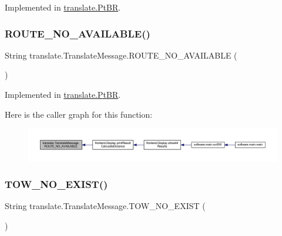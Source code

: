 Implemented in \hyperlink{classtranslate_1_1_pt_b_r_aa9cef0ea9eb36d51a17532a6c216e6bd}{translate.\+Pt\+BR}.

\mbox{\label{interfacetranslate_1_1_translate_message_a0344fddc67cf717c9129ef5677d0c0aa}} 
\subsubsection{\texorpdfstring{R\+O\+U\+T\+E\+\_\+\+N\+O\+\_\+\+A\+V\+A\+I\+L\+A\+B\+L\+E()}{ROUTE\_NO\_AVAILABLE()}}
{\footnotesize\ttfamily String translate.\+Translate\+Message.\+R\+O\+U\+T\+E\+\_\+\+N\+O\+\_\+\+A\+V\+A\+I\+L\+A\+B\+LE (\begin{DoxyParamCaption}{ }\end{DoxyParamCaption})}



Implemented in \hyperlink{classtranslate_1_1_pt_b_r_a218e01c1590aa220f2c260639080cca2}{translate.\+Pt\+BR}.

Here is the caller graph for this function\+:\nopagebreak
\begin{figure}[H]
\begin{center}
\leavevmode
\includegraphics[width=350pt]{interfacetranslate_1_1_translate_message_a0344fddc67cf717c9129ef5677d0c0aa_icgraph}
\end{center}
\end{figure}
\mbox{\label{interfacetranslate_1_1_translate_message_a14980a980a4b83cdb91d03ffc38ee0a9}} 
\subsubsection{\texorpdfstring{T\+O\+W\+\_\+\+N\+O\+\_\+\+E\+X\+I\+S\+T()}{TOW\_NO\_EXIST()}}
{\footnotesize\ttfamily String translate.\+Translate\+Message.\+T\+O\+W\+\_\+\+N\+O\+\_\+\+E\+X\+I\+ST (\begin{DoxyParamCaption}{ }\end{DoxyParamCaption})}



